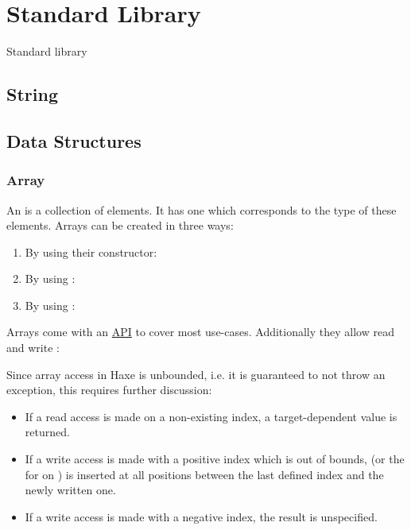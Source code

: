 \chapter{Standard Library}
\label{std}

Standard library

\section{String}
\label{std-String}



\section{Data Structures}
\label{std-ds}

\subsection{Array}
\label{std-Array}

An  is a collection of elements. It has one  which corresponds to the type of these elements. Arrays can be created in three ways:

\begin{enumerate}
	\item By using their constructor: 
	\item By using : \expr{[1, 2, 3]}
	\item By using : \expr{[for (i in 0...10) if (i \% 2 == 0) i]}
\end{enumerate}

Arrays come with an \href{http://api.haxe.org/Array.html}{API} to cover most use-cases. Additionally they allow read and write :


Since array access in Haxe is unbounded, i.e. it is guaranteed to not throw an exception, this requires further discussion:

\begin{itemize}
	\item If a read access is made on a non-existing index, a target-dependent value is returned.
	\item If a write access is made with a positive index which is out of bounds,  (or the  for  on ) is inserted at all positions between the last defined index and the newly written one.
	\item If a write access is made with a negative index, the result is unspecified.
\end{itemize}

